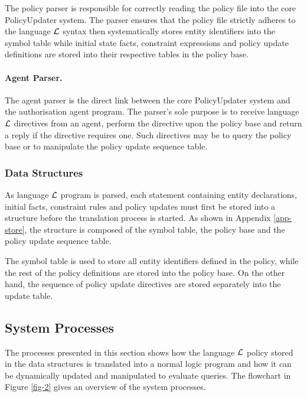 \documentclass[glov2,twocolumn,final]{svjour2}
\begin{document}
          The policy parser is responsible for correctly reading the policy
          file into the core PolicyUpdater system. The parser ensures that
          the policy file strictly adheres to the language $\cal{L}$ syntax
          then systematically stores entity identifiers into the symbol table
          while initial state facts, constraint expressions and policy update
          definitions are stored into their respective tables in the policy
          base.

        \paragraph{Agent Parser.}

          The agent parser is the direct link between the core PolicyUpdater
          system and the authorisation agent program. The parser's sole purpose
          is to receive language $\cal{L}$ directives from an agent, perform
          the directive upon the policy base and return a reply if the
          directive requires one. Such directives may be to query the policy
          base or to manipulate the policy update sequence table.

      \subsubsection{Data Structures}

        As language ${\cal L}$ program is parsed, each statement containing
        entity declarations, initial facts, constraint rules and policy
        updates must first be stored into a structure before the translation
        process is started. As shown in Appendix \ref{app-store}, the structure
        is composed of the symbol table, the policy base and the policy update
        sequence table.

        The symbol table is used to store all entity identifiers defined in the
        policy, while the rest of the policy definitions are stored into the
        policy base. On the other hand, the sequence of policy update
        directives are stored separately into the update table.

    \subsection{System Processes}

      The processes presented in this section shows how the language
      ${\cal L}$ policy stored in the data structures is translated into a
      normal logic program and how it can be dynamically updated and
      manipulated to evaluate queries. The flowchart in Figure \ref{fig-2}
      gives an overview of the system processes.
\end{document}
